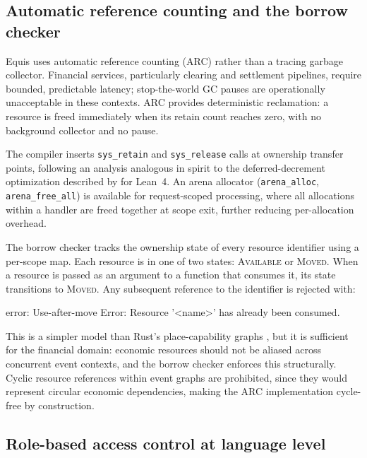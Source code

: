 \documentclass[11pt,a4paper]{article}
\theoremstyle{remark}
\begin{document}
\subsection{Automatic reference counting and the borrow checker}\label{sec:design:arc}

Equis uses automatic reference counting (ARC) rather than a tracing
garbage collector. Financial services, particularly clearing and
settlement pipelines, require bounded, predictable latency;
stop-the-world GC pauses are operationally unacceptable in these
contexts. ARC provides deterministic reclamation: a resource is freed
immediately when its retain count reaches zero, with no background
collector and no pause.

The compiler inserts \texttt{sys\_retain} and \texttt{sys\_release}
calls at ownership transfer points, following an analysis analogous in
spirit to the deferred-decrement optimization described by
\citet{ullrich_counting_2021} for Lean~4. An arena allocator
(\texttt{arena\_alloc}, \texttt{arena\_free\_all}) is available for
request-scoped processing, where all allocations within a handler are
freed together at scope exit, further reducing per-allocation overhead.

The borrow checker tracks the ownership state of every resource
identifier using a per-scope map. Each resource is in one of two states:
\textsc{Available} or \textsc{Moved}. When a resource is passed as an
argument to a function that consumes it, its state transitions to
\textsc{Moved}. Any subsequent reference to the identifier is rejected
with:

\begin{plaincode}
error: Use-after-move Error: Resource '<name>' has already
       been consumed.
\end{plaincode}

This is a simpler model than Rust's place-capability graphs
\citep{crichton_grounded_2023}, but it is sufficient for the financial
domain: economic resources should not be aliased across concurrent event
contexts, and the borrow checker enforces this structurally. Cyclic
resource references within event graphs are prohibited, since they would
represent circular economic dependencies, making the ARC implementation
cycle-free by construction.

\subsection{Role-based access control at language level}\label{sec:design:rbac}
\end{document}
